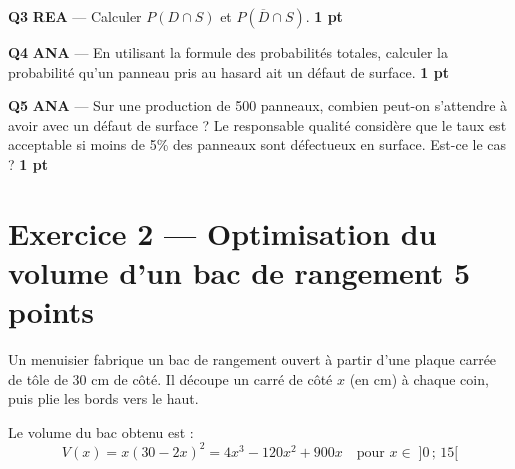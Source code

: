 \documentclass[a4paper,11pt]{article}
\newcommand{\pts}[1]{\hfill\textcolor{gris}{\small\textbf{#1}}}
\newcommand{\comp}[1]{\colorbox{blue!10}{\scriptsize\textbf{#1}}}
\begin{document}
\textbf{Q3} \comp{REA} — Calculer $P(D \cap S)$ et $P(\overline{D} \cap S)$. \pts{1 pt}

\begin{reponsebox}[3cm]
\dotfill

\dotfill

\dotfill
\end{reponsebox}

\textbf{Q4} \comp{ANA} — En utilisant la formule des probabilités totales, calculer la probabilité qu'un panneau pris au hasard ait un défaut de surface. \pts{1 pt}

\begin{reponsebox}[3cm]
\dotfill

\dotfill

\dotfill
\end{reponsebox}

\textbf{Q5} \comp{ANA} — Sur une production de 500 panneaux, combien peut-on s'attendre à avoir avec un défaut de surface ? Le responsable qualité considère que le taux est acceptable si moins de 5\% des panneaux sont défectueux en surface. Est-ce le cas ? \pts{1 pt}

\begin{reponsebox}[3cm]
\dotfill

\dotfill

\dotfill
\end{reponsebox}

\newpage

\section*{Exercice 2 — Optimisation du volume d'un bac de rangement \pts{5 points}}

\begin{contextebox}
Un menuisier fabrique un bac de rangement ouvert à partir d'une plaque carrée de tôle de 30 cm de côté. Il découpe un carré de côté $x$ (en cm) à chaque coin, puis plie les bords vers le haut.

Le volume du bac obtenu est :
\[V(x) = x(30 - 2x)^2 = 4x^3 - 120x^2 + 900x \quad \text{pour } x \in \;]0\,;\,15[\]
\end{contextebox}
\end{document}
